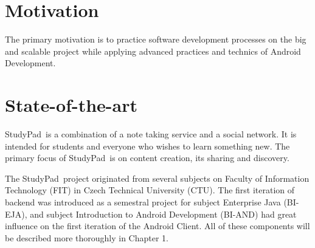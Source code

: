 \documentclass[thesis=B,english]{FITthesis}[2012/10/20]
\newcommand{\appname}{StudyPad}
\begin{document}
\section{Motivation}
The primary motivation is to practice software
development processes on the big and scalable project while applying advanced practices and technics of Android Development.

\section{State-of-the-art}
\appname\ is a combination of a note taking service and a social network. It is intended for students and everyone who wishes to learn something new. The primary focus of \appname\ is on content creation, its sharing and discovery. 

The \appname\ project originated from several subjects on Faculty of Information Technology (FIT) in Czech Technical University (CTU). The first iteration of backend was introduced as a semestral project for subject Enterprise Java (BI-EJA), and subject Introduction to Android Development (BI-AND) had great influence on the first iteration of the Android Client. All of these components will be described more thoroughly in Chapter 1.
\end{document}
